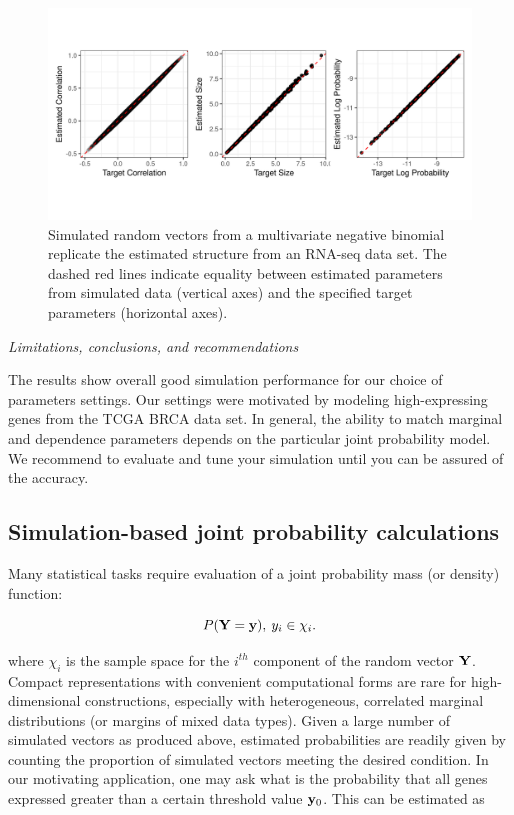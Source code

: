 \documentclass[
]{jss}
\begin{document}
\begin{CodeChunk}
\begin{figure}

{\centering \includegraphics[width=0.8\linewidth]{fig/ch050-figBRCA} 

}

\caption[Simulated random vectors from a multivariate negative binomial replicate the estimated structure from an RNA-seq data set]{Simulated random vectors from a multivariate negative binomial replicate the estimated structure from an RNA-seq data set. The dashed red lines indicate equality between estimated parameters from simulated data (vertical axes) and the specified target parameters (horizontal axes).}\label{fig:ch050-figBRCA}
\end{figure}
\end{CodeChunk}

\emph{Limitations, conclusions, and recommendations}

The results show overall good simulation performance for our choice of
parameters settings. Our settings were motivated by modeling
high-expressing genes from the TCGA BRCA data set. In general, the
ability to match marginal and dependence parameters depends on the
particular joint probability model. We recommend to evaluate and tune
your simulation until you can be assured of the accuracy.

\hypertarget{simulation-based-joint-probability-calculations}{%
\subsection{Simulation-based joint probability
calculations}\label{simulation-based-joint-probability-calculations}}

Many statistical tasks require evaluation of a joint probability mass
(or density) function:

\[
P( {\bf Y} = {\bf y} ), \: y_i \in \chi_i.
\]

where \(\chi_i\) is the sample space for the \(i^{th}\) component of the
random vector \(\bf{Y}\). Compact representations with convenient
computational forms are rare for high-dimensional constructions,
especially with heterogeneous, correlated marginal distributions (or
margins of mixed data types). Given a large number of simulated vectors
as produced above, estimated probabilities are readily given by counting
the proportion of simulated vectors meeting the desired condition. In
our motivating application, one may ask what is the probability that all
genes expressed greater than a certain threshold value \({\bf y}_0\).
This can be estimated as
\end{document}
